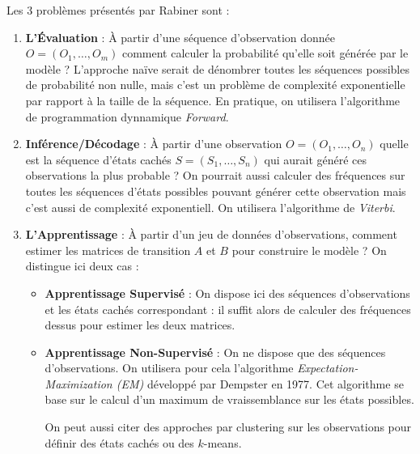 \begin{proposition}
    Les 3 problèmes présentés par Rabiner sont : 
    \begin{enumerate}
        \item \textbf{L'Évaluation} : À partir d'une séquence d'observation donnée $O = (O_1, \dots, O_m)$ comment calculer la probabilité qu'elle soit générée par le modèle ? 
        L'approche naïve serait de dénombrer toutes les séquences possibles de probabilité non nulle, mais c'est un problème de complexité exponentielle par rapport à la taille de la séquence. En pratique, on utilisera l'algorithme de programmation dynnamique \emph{Forward}. 
        \item \textbf{Inférence/Décodage} : À partir d'une observation $O = (O_1, \dots, O_n)$ quelle est la séquence d'états cachés $S = (S_1, \dots, S_n)$ qui aurait généré ces observations la plus probable ? 
        On pourrait aussi calculer des fréquences sur toutes les séquences d'états possibles pouvant générer cette observation mais c'est aussi de complexité exponentiell. On utilisera l'algorithme de \emph{Viterbi}. 
        \item \textbf{L'Apprentissage} : À partir d'un jeu de données d'observations, comment estimer les matrices de transition $A$ et $B$ pour construire le modèle ? On distingue ici deux cas : 
        \begin{itemize}
            \item \textbf{Apprentissage Supervisé} : On dispose ici des séquences d'observations et les états cachés correspondant : il suffit alors de calculer des fréquences dessus pour estimer les deux matrices. 
            \item \textbf{Apprentissage Non-Supervisé} : On ne dispose que des séquences d'observations. On utilisera pour cela l'algorithme \emph{Expectation-Maximization (EM)} développé par Dempster en 1977. 
            Cet algorithme se base sur le calcul d'un maximum de vraissemblance sur les états possibles. 

            On peut aussi citer des approches par clustering sur les observations pour définir des états cachés ou des $k$-means. 
        \end{itemize}
    \end{enumerate}
\end{proposition}


